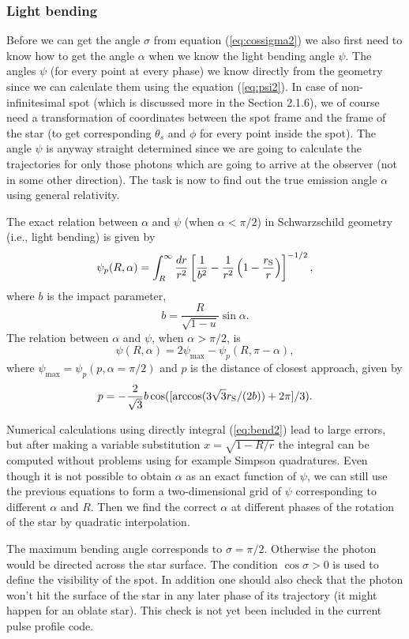 \documentclass{wihuri}
\def\rg{r_{\rm S}} %
\def\be{\begin{equation}}
\def\ee{\end{equation}}
\def\rg{r_{\rm S}} %
\def\thetas{\theta_{s}}
\begin{document}
\subsubsection{Light bending}

Before we can get the angle $\sigma$ from equation (\ref{eq:cossigma2}) we also first need to know how to get the angle $\alpha$ when we know the light bending angle $\psi$. The angles $\psi$ (for every point at every phase) we know directly from the geometry since we can calculate them using the equation (\ref{eq:psi2}). In case of non-infinitesimal spot (which is discussed more in the Section 2.1.6), we of course need a  transformation of coordinates between the spot frame and the frame of the star (to get corresponding $\thetas$ and $\phi$ for every point inside the spot). The angle $\psi$ is anyway straight determined since we are going to calculate the trajectories for only those photons which are going to arrive at the observer (not in some other direction). The task is now to find out the true emission angle $\alpha$ using general relativity. 

The exact relation between $\alpha$ and $\psi$ (when $\alpha < \pi/2$) in Schwarzschild geometry (i.e., light bending) is given by \cite{mtw}%
\be \label{eq:bend2}
  \psi_{p}(R,\alpha)=\int_R^{\infty} \frac{dr}{r^2} \left[ \frac{1}{b^2} -
       \frac{1}{r^2}\left( 1- \frac{\rg}{r}\right)\right]^{-1/2} ,
\ee
where $b$ is the impact parameter,
\be \label{eq:impact2}
  b=\frac{R}{\sqrt{1-u}} \sin\alpha .
\ee
The relation between  $\alpha$ and $\psi$, when $\alpha > \pi/2$, is 
\be 
\psi(R,\alpha)=2\psi_{\max}-\psi_{p}(R,\pi-\alpha),
\ee 
where $\psi_{\max} = \psi_{p}(p,\alpha=\pi/2)$ and $p$ is the distance of closest approach, given by
\be
p = -\frac{2}{\sqrt{3}}b\cos([\arccos(3\sqrt{3}\rg/(2b))+2\pi]/3).
\ee


Numerical calculations using directly integral (\ref{eq:bend2}) lead to large errors, but after making a variable substitution $x = \sqrt{1-R/r}$ the integral can be computed without problems using for example Simpson quadratures. Even though it is not possible to obtain $\alpha$ as an exact function of $\psi$, we can still use the previous equations to form a two-dimensional grid of $\psi$ corresponding to different $\alpha$ and $R$. Then we find the correct $\alpha$ at different phases of the rotation of the star by quadratic interpolation. 



The maximum bending angle corresponds to $\sigma=\pi/2$. Otherwise the photon would be directed across the star surface. 
The condition $\cos \sigma>0$ is used to define the visibility of the spot. In addition one should also check that the photon won't hit the surface of the star in any later phase of its trajectory (it might happen for an oblate star). This check is not yet been included in the current pulse profile code.
\end{document}
